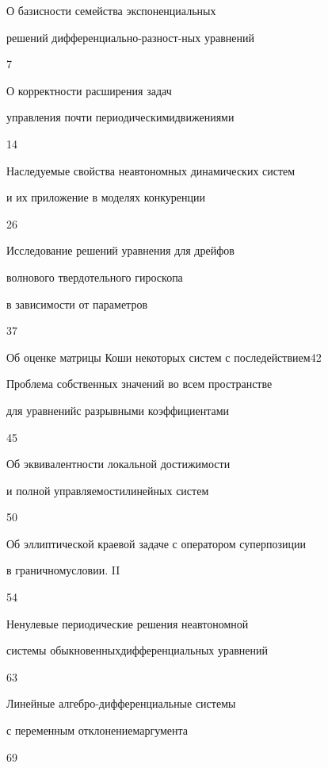 

{О базисности семейства экспоненциальных  


решений дифференциально-разност-\newline ных уравнений}{7}




{О корректности расширения задач


управления почти периодическими\newline движениями}{14}




{Наследуемые свойства неавтономных динамических систем\newline


и их приложение в моделях конкуренции}{26}




{Исследование решений уравнения для дрейфов\newline


волнового твердотельного гироскопа


в зависимости от параметров}{37}




{Об оценке матрицы Коши некоторых систем с последействием}{42}




{Проблема собственных значений во всем пространстве


для уравнений\newline с разрывными коэффициентами}{45}




{Об эквивалентности локальной достижимости


и полной управляемости\newline линейных систем}{50}




{Об эллиптической краевой задаче с оператором суперпозиции  


в граничном\newline условии. II}{54}




{Ненулевые периодические решения неавтономной


системы обыкновенных\newline дифференциальных уравнений}{63}




{Линейные алгебро-дифференциальные системы


с переменным отклонением\newline аргумента}{69}











